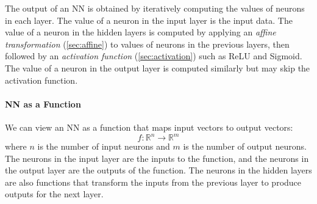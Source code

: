 \documentclass[oneside,11pt,dvipsnames]{book}
\numberwithin{equation}{section}
\theoremstyle{definition}
\theoremstyle{remark}
\newcommand{\tool}{\texttt{NeuralSAT}}
\begin{document}

The output of an NN is obtained by iteratively computing  the  values  of  neurons  in  each  layer.
The value of a neuron in the input layer is the input data.
The value of a neuron in the hidden layers is computed by applying an \emph{affine transformation} (\autoref{sec:affine}) to values of neurons in the previous layers, then followed by an \emph{activation function} (\autoref{sec:activation}) such as ReLU and Sigmoid.
The value of a neuron in the output layer is computed similarly but may skip the activation function.

\paragraph{NN as a Function} We can view an NN as a function that maps input vectors to output vectors:
\begin{equation}
f: \mathbb{R}^{n} \to \mathbb{R}^{m}
\end{equation}
where \(n\) is the number of input neurons and \(m\) is the number of output neurons. The neurons in the input layer are the inputs to the function, and the neurons in the output layer are the outputs of the function. The neurons in the hidden layers are also functions that transform the inputs from the previous layer to produce outputs for the next layer.

\end{document}
